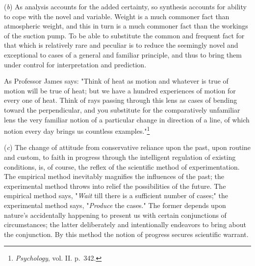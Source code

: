 \documentclass[showtrims,ustradepaper]{memoir}
\begin{document}

(\emph{b}) As analysis accounts for the added certainty, so synthesis
accounts for ability to cope with the novel and variable. Weight is a
much commoner fact than atmospheric weight, and this in turn is a much
commoner fact than the workings of the suction pump. To be able to
substitute the common and frequent fact for that which is relatively
rare and peculiar is to reduce the seemingly novel and exceptional to
cases of a general and familiar principle, and thus to bring them under
control for interpretation and prediction.

As Professor James says: "Think of heat as motion and whatever is true
of motion will be true of heat; but we have a hundred experiences of
motion for every one of heat. Think of rays passing through this lens as
cases of bending toward the perpendicular, and
you
substitute for the comparatively unfamiliar lens the very familiar
notion of a particular change in direction of a line, of which notion
every day brings us countless
examples."\footnote{\emph{Psychology}, vol. II. p.\ 342.}


(\emph{c}) The change of attitude from conservative reliance upon the
past, upon routine and custom, to faith in progress through the
intelligent regulation of existing conditions, is, of course, the reflex
of the scientific method of experimentation. The empirical method
inevitably magnifies the influences of the past; the experimental method
throws into relief the possibilities of the future. The empirical method
says, "\emph{Wait} till there is a sufficient number of cases;" the
experimental method says, "\emph{Produce} the cases." The former depends
upon nature's accidentally happening to present us with certain
conjunctions of circumstances; the latter deliberately and intentionally
endeavors to bring about the conjunction. By this method the notion of
progress secures scientific warrant.

\end{document}
